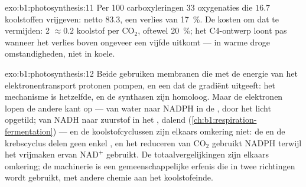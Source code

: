 \begin{solution}{exo:b1:photosynthesis:11}
Per 100 carboxyleringen 33 oxygenaties die $16.7$ koolstoffen vrijgeven: netto
$83.3$, een verlies van \qty{17}{\%}. De kosten om dat te vermijden: 2  $\approx
0.2$ koolstof per $\mathrm{CO_2}$, oftewel \qty{20}{\%}; het C4-ontwerp loont pas
wanneer het verlies boven ongeveer een vijfde uitkomt --- in warme droge
omstandigheden, niet in koele.
\end{solution}

\begin{solution}{exo:b1:photosynthesis:12}
Beide gebruiken membranen die met de energie van het elektronentransport protonen
pompen, en een  dat de gradiënt uitgeeft: het mechanisme is hetzelfde,
en de synthasen zijn homoloog. Maar de elektronen lopen de andere kant op --- van
water naar NADPH in de , door het licht opgetild; van NADH naar zuurstof
in het , dalend (\cref{ch:b1:respiration-fermentation}) --- en de
koolstofcyclussen zijn elkaars omkering niet: de  en de krebscyclus
delen geen enkel , en het reduceren van $\mathrm{CO_2}$ gebruikt NADPH terwijl
het vrijmaken ervan $\mathrm{NAD^+}$ gebruikt. De totaalvergelijkingen zijn
elkaars omkering; de machinerie is een gemeenschappelijke erfenis die in twee
richtingen wordt gebruikt, met andere chemie aan het koolstofeinde.
\end{solution}

